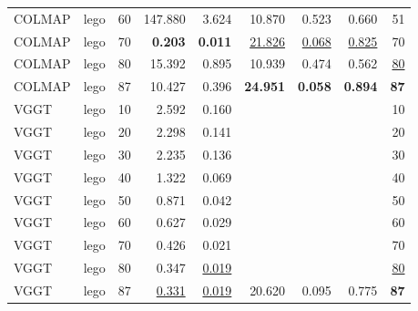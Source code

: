 \begin{table}[H]
\begin{tabular}{llrrrrrrr}
COLMAP & lego & 60 & 147.880 & 3.624 & 10.870 & 0.523 & 0.660 & 51 \\
COLMAP & lego & 70 & \textbf{0.203} & \textbf{0.011} & \underline{21.826} & \underline{0.068} & \underline{0.825} & 70 \\
COLMAP & lego & 80 & 15.392 & 0.895 & 10.939 & 0.474 & 0.562 & \underline{80} \\
COLMAP & lego & 87 & 10.427 & 0.396 & \textbf{24.951} & \textbf{0.058} & \textbf{0.894} & \textbf{87} \\
VGGT & lego & 10 & 2.592 & 0.160 &  &  &  & 10 \\
VGGT & lego & 20 & 2.298 & 0.141 &  &  &  & 20 \\
VGGT & lego & 30 & 2.235 & 0.136 &  &  &  & 30 \\
VGGT & lego & 40 & 1.322 & 0.069 &  &  &  & 40 \\
VGGT & lego & 50 & 0.871 & 0.042 &  &  &  & 50 \\
VGGT & lego & 60 & 0.627 & 0.029 &  &  &  & 60 \\
VGGT & lego & 70 & 0.426 & 0.021 &  &  &  & 70 \\
VGGT & lego & 80 & 0.347 & \underline{0.019} &  &  &  & \underline{80} \\
VGGT & lego & 87 & \underline{0.331} & \underline{0.019} & 20.620 & 0.095 & 0.775 & \textbf{87} \\
\bottomrule
\end{tabular}
\end{table}